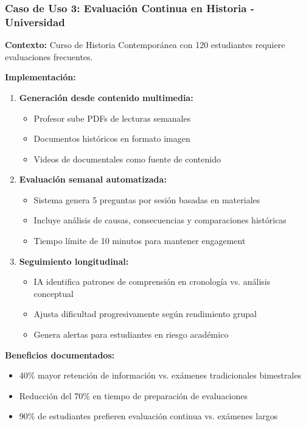 \documentclass[12pt,a4paper]{report}
\begin{document}
\subsubsection{Caso de Uso 3: Evaluación Continua en Historia - Universidad}

\textbf{Contexto:} Curso de Historia Contemporánea con 120 estudiantes requiere evaluaciones frecuentes.

\textbf{Implementación:}
\begin{enumerate}
\item \textbf{Generación desde contenido multimedia:}
   \begin{itemize}
   \item Profesor sube PDFs de lecturas semanales
   \item Documentos históricos en formato imagen
   \item Videos de documentales como fuente de contenido
   \end{itemize}

\item \textbf{Evaluación semanal automatizada:}
   \begin{itemize}
   \item Sistema genera 5 preguntas por sesión basadas en materiales
   \item Incluye análisis de causas, consecuencias y comparaciones históricas
   \item Tiempo límite de 10 minutos para mantener engagement
   \end{itemize}

\item \textbf{Seguimiento longitudinal:}
   \begin{itemize}
   \item IA identifica patrones de comprensión en cronología vs. análisis conceptual
   \item Ajusta dificultad progresivamente según rendimiento grupal
   \item Genera alertas para estudiantes en riesgo académico
   \end{itemize}
\end{enumerate}

\textbf{Beneficios documentados:}
\begin{itemize}
\item 40\% mayor retención de información vs. exámenes tradicionales bimestrales
\item Reducción del 70\% en tiempo de preparación de evaluaciones
\item 90\% de estudiantes prefieren evaluación continua vs. exámenes largos
\end{itemize}
\end{document}
